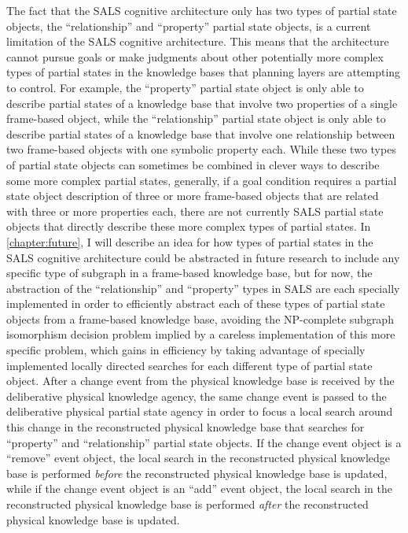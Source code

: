 The fact that the SALS cognitive architecture only has two types of
partial state objects, the ``relationship'' and ``property'' partial
state objects, is a current limitation of the SALS cognitive
architecture.  This means that the architecture cannot pursue goals or
make judgments about other potentially more complex types of partial
states in the knowledge bases that planning layers are attempting to
control.  For example, the ``property'' partial state object is only
able to describe partial states of a knowledge base that involve two
properties of a single frame-based object, while the ``relationship''
partial state object is only able to describe partial states of a
knowledge base that involve one relationship between two frame-based
objects with one symbolic property each.  While these two types of
partial state objects can sometimes be combined in clever ways to
describe some more complex partial states, generally, if a goal
condition requires a partial state object description of three or more
frame-based objects that are related with three or more properties
each, there are not currently SALS partial state objects that directly
describe these more complex types of partial states.  In
{\mbox{\autoref{chapter:future}}}, I will describe an idea for how
types of partial states in the SALS cognitive architecture could be
abstracted in future research to include any specific type of subgraph
in a frame-based knowledge base, but for now, the abstraction of the
``relationship'' and ``property'' types in SALS are each specially
implemented in order to efficiently abstract each of these types of
partial state objects from a frame-based knowledge base, avoiding the
NP-complete subgraph isomorphism decision problem
\cite[]{messmer:1995,messmer:2000} implied by a careless
implementation of this more specific problem, which gains in
efficiency by taking advantage of specially implemented locally
directed searches for each different type of partial state object.
After a change event from the physical knowledge base is received by
the deliberative physical knowledge agency, the same change event is
passed to the deliberative physical partial state agency in order to
focus a local search around this change in the reconstructed physical
knowledge base that searches for ``property'' and ``relationship''
partial state objects.  If the change event object is a ``remove''
event object, the local search in the reconstructed physical knowledge
base is performed \emph{before} the reconstructed physical knowledge
base is updated, while if the change event object is an ``add'' event
object, the local search in the reconstructed physical knowledge base
is performed \emph{after} the reconstructed physical knowledge base is
updated.

